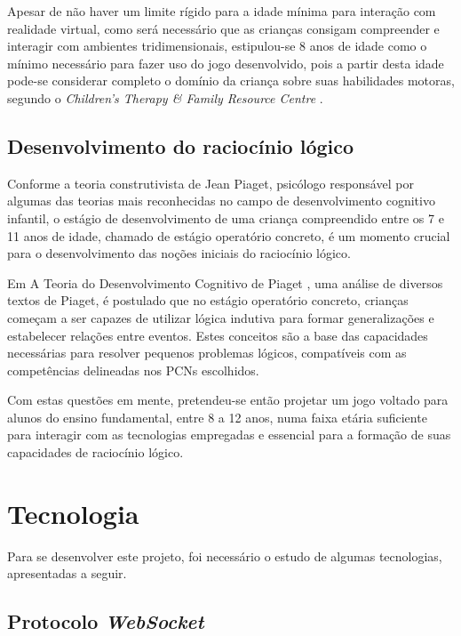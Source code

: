 Apesar de não haver um limite rígido para a idade mínima para interação com
realidade virtual, como será necessário que as crianças consigam compreender
e interagir com ambientes tridimensionais, estipulou-se 8 anos de idade como
o mínimo necessário para fazer uso do jogo desenvolvido, pois a partir desta
idade pode-se considerar completo o domínio da criança sobre suas habilidades
motoras, segundo o \textit{Children’s Therapy \& Family Resource Centre} \cite{ctfrc:motor-skills}.

\subsection{Desenvolvimento do raciocínio lógico}

Conforme a teoria construtivista de Jean Piaget, psicólogo responsável por algumas
das teorias mais reconhecidas no campo de desenvolvimento cognitivo infantil, o
estágio de desenvolvimento de uma criança compreendido entre os 7 e 11 anos de 
idade, chamado de estágio operatório concreto, é um momento crucial para o 
desenvolvimento das noções iniciais do raciocínio lógico. 

Em A Teoria do Desenvolvimento Cognitivo de Piaget \cite{opper:1969:theory_intellectual_development},
uma análise de diversos textos de Piaget, é postulado que no estágio operatório
concreto, crianças começam a ser capazes de utilizar lógica indutiva para formar
generalizações e estabelecer relações entre eventos. Estes conceitos são a base
das capacidades necessárias para resolver pequenos problemas lógicos, compatíveis
com as competências delineadas nos PCNs escolhidos.

Com estas questões em mente, pretendeu-se então projetar um jogo voltado para
alunos do ensino fundamental, entre 8 a 12 anos, numa faixa etária suficiente
para interagir com as tecnologias empregadas e essencial para a formação de
suas capacidades de raciocínio lógico.

\section{Tecnologia}\label{sec-tecnologia}

Para se desenvolver este projeto, foi necessário o estudo de algumas tecnologias, apresentadas a seguir. 
\subsection{Protocolo \textit{WebSocket}}\label{subsec-teo-websocket}

